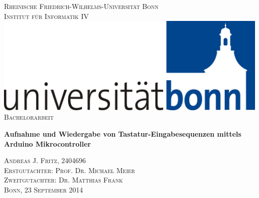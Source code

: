\thispagestyle{empty}
\begin{center}
  \textsc{\large Rheinische Friedrich-Wilhelms-Universität Bonn}\\[1pc]
  \textsc{\large Institut für Informatik IV}\\[2pc]
  \includegraphics[scale=0.07]{images/logo}\\
  \vspace*{\fill}
  \textsc{\large Bachelorarbeit}\\[3pc]
  \begin{spacing}{2}
    \textbf{\LARGE Aufnahme und Wiedergabe von Tastatur-Eingabesequenzen mittels Arduino Mikrocontroller}\\[3pc]
  \end{spacing}
  \textsc{\large Andreas J. Fritz, 2404696}\\
  \vspace*{\fill}
  \textsc{\large Erstgutachter: Prof. Dr. Michael Meier}\\[1pc]
  \textsc{\large Zweitgutachter: Dr. Matthias Frank}\\[1pc]
  \textsc{\large Bonn, 23 September 2014}
\end{center}